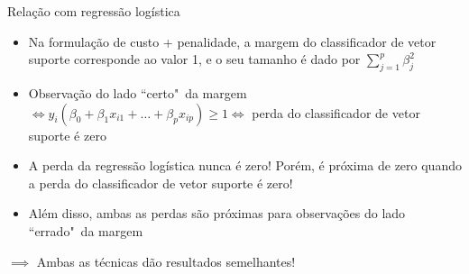 \begin{frame}{Relação com regressão logística}
    \begin{itemize}
        \item Na formulação de custo + penalidade, a margem do classificador de vetor suporte corresponde ao valor 1, e o seu tamanho é dado por $\sum_{j = 1}^{p} \beta_j^2$
        
        \pause
        
        \item Observação do lado ``certo"~da margem $\iff y_i(\beta_0 + \beta_1 x_{i1} + \dots + \beta_p x_{ip}) \geq 1 \iff$ perda do classificador de vetor suporte é zero
        
        \pause
        
        \item A perda da regressão logística nunca é zero! Porém, é \alert{próxima} de zero quando a perda do classificador de vetor suporte é zero!
        
        \pause
        
        \item Além disso, ambas as perdas são próximas para observações do lado ``errado"~da margem
    \end{itemize}
    
    \pause
    
    \begin{center}
        $\implies$ Ambas as técnicas dão resultados semelhantes!
    \end{center}
\end{frame}



